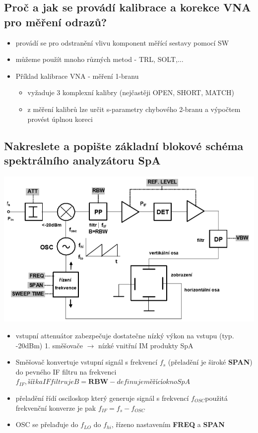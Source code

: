 \documentclass[a4paper]{article}
\begin{document}
\subsection{\textbf{Proč a jak se provádí kalibrace a korekce VNA pro měření odrazů?}}
\begin{itemize}
	\item provádí se pro odstranění vlivu komponent měřící sestavy pomocí SW
	\item můžeme použít mnoho různých metod - TRL, SOLT,...
	\item Příklad kalibrace VNA - měření 1-branu
	\begin{itemize}
		\item vyžaduje 3 komplexní kalibry (nejčastěji OPEN, SHORT, MATCH)
		\item z měření kalibrů lze určit s-parametry chybového 2-branu a výpočtem provést úplnou koreci
	\end{itemize}
\end{itemize}
\subsection{\textbf{Nakreslete a popište základní blokové schéma spektrálního analyzátoru SpA}}
\includegraphics{images/SpA.png}
\begin{itemize}
	\item vstupní attenuátor zabezpečuje dostatečne nízký výkon na vstupu (typ. -20dBm) 1. směšovače $\to$ nízké vnitřní IM produkty SpA
	\item Směšovač konvertuje vstupní signál s frekvencí $f_s$ (přeladění je široké \textbf{SPAN}) do pevného IF filtru na frekvenci $f_{IF}, šířka IF filtru je B=\textbf{RBW} - definuje měřící okno SpA$
	\item přeladění řídí osciloskop který generuje signál s frekvencí $f_{OSC}$použitá frekvenční konverze je pak $f_{IF} = f_s-f_{OSC}$
	\item OSC se přelaďuje do $f_{LO}$ do $f_{hi}$, řízeno nastavením \textbf{FREQ} a \textbf{SPAN}
\end{itemize}
\end{document}
